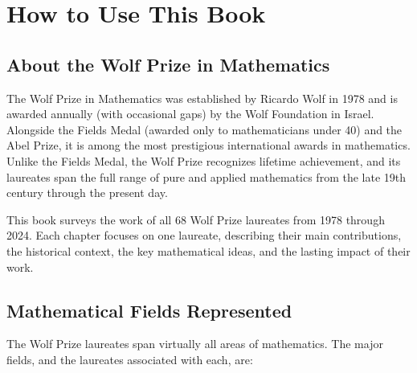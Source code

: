 \chapter{How to Use This Book}

\section{About the Wolf Prize in Mathematics}

The Wolf Prize in Mathematics was established by Ricardo Wolf in 1978 and is awarded annually (with occasional gaps) by the Wolf Foundation in Israel. Alongside the Fields Medal (awarded only to mathematicians under 40) and the Abel Prize, it is among the most prestigious international awards in mathematics. Unlike the Fields Medal, the Wolf Prize recognizes lifetime achievement, and its laureates span the full range of pure and applied mathematics from the late 19th century through the present day.

This book surveys the work of all 68 Wolf Prize laureates from 1978 through 2024. Each chapter focuses on one laureate, describing their main contributions, the historical context, the key mathematical ideas, and the lasting impact of their work.

\section{Mathematical Fields Represented}

The Wolf Prize laureates span virtually all areas of mathematics. The major fields, and the laureates associated with each, are:

